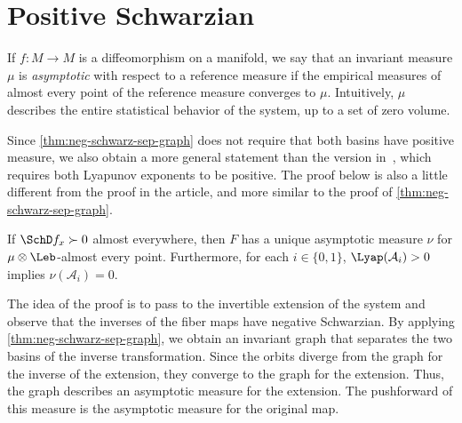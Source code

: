 \documentclass[../main]{subfiles}
\begin{document}




\section{Positive Schwarzian}

If \(f \colon M \to M\) is a diffeomorphism on a manifold, we say that an invariant measure \(\mu\) is \emph{asymptotic} with respect to a reference measure if the empirical measures of almost every point of the reference measure converges to \(\mu\). Intuitively, \(\mu\) describes the entire statistical behavior of the system, up to a set of zero volume.

Since \cref{thm:neg-schwarz-sep-graph} does not require that both basins have positive measure, we also obtain a more general statement than the version in~\cite[Theorem 5.1]{bonifantSchwarzianDerivativesCylinder2008}, which requires both Lyapunov exponents to be positive. The proof below is also a little different from the proof in the article, and more similar to the proof of \cref{thm:neg-schwarz-sep-graph}.

\begin{theorem}\label{thm:pos-schwarz-asymptotic}
  If \(\SchD f_x \succ 0\) almost everywhere, then \(F\) has a unique asymptotic measure \(\nu\) for \(\mu \otimes \Leb\)-almost every point. Furthermore, for each \(i \in \{ 0,1 \}\), \(\Lyap(\mathcal{A}_i) > 0\) implies \(\nu(\mathcal{A}_i) = 0\).
\end{theorem}

The idea of the proof is to pass to the invertible extension of the system and observe that the inverses of the fiber maps have negative Schwarzian. By applying \cref{thm:neg-schwarz-sep-graph}, we obtain an invariant graph that separates the two basins of the inverse transformation. Since the orbits diverge from the graph for the inverse of the extension, they converge to the graph for the extension. Thus, the graph describes an asymptotic measure for the extension. The pushforward of this measure is the asymptotic measure for the original map.
\end{document}
